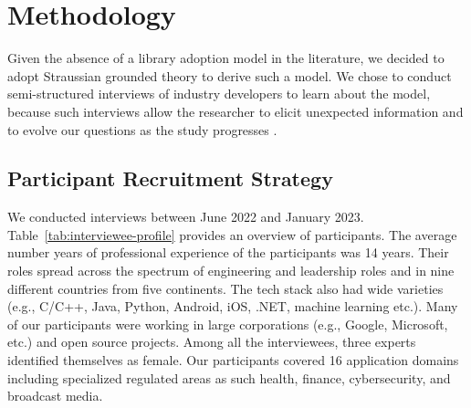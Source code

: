 \section{Methodology}\label{sec:methodology}
Given the absence of a library adoption model in the literature, we decided to adopt Straussian grounded theory \cite{corbin2014gt} to derive such a model.  
We chose to conduct semi-structured interviews of industry developers to learn about the model, because such interviews allow the researcher to elicit unexpected information and to evolve our questions as the study progresses \cite{HoveAnda,Seaman}. 







\subsection{Participant Recruitment Strategy}
We conducted \numInterviews interviews between June 2022 and January 2023. Table~\ref{tab:interviewee-profile} provides an overview of participants.
The average number years of professional experience of the participants was 14 years. Their roles spread across the spectrum of engineering and leadership roles and in nine different countries from five continents. The tech stack also had wide varieties (e.g., C/C++, Java, Python, Android, iOS, .NET, machine learning etc.). Many of our participants were working in large corporations (e.g., Google, Microsoft, etc.) and open source projects. Among all the interviewees, three experts identified themselves as female. Our participants covered 16 application domains including specialized regulated areas as such health, finance, cybersecurity, and broadcast media. 

